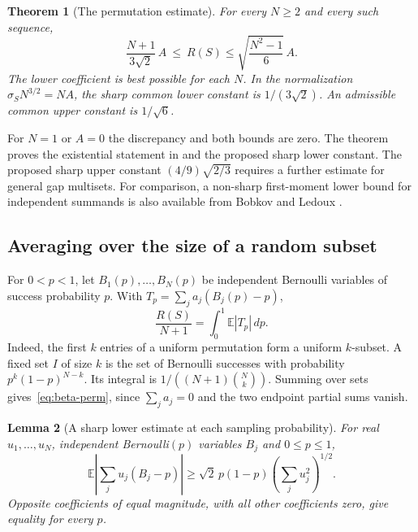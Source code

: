 \documentclass[11pt,a4paper]{article}
\newtheorem{theorem}{Theorem}[section]
\newtheorem{lemma}[theorem]{Lemma}
\begin{document}
\begin{theorem}[The permutation estimate]
\label{thm:fareyperm}
For every $N\ge 2$ and every such sequence,
\[
 \frac{N+1}{3\sqrt 2}\,A\ \le\ R(S) \le\sqrt{\frac{N^2-1}{6}}\,A.
\]
The lower coefficient is best possible for each $N$. In the
normalization $\sigma_S N^{3/2}=NA$, the sharp common lower constant
is $1/(3\sqrt2)$. An admissible common upper constant is $1/\sqrt 6$.
\end{theorem}

\noindent
For $N=1$ or $A=0$ the discrepancy and both bounds are zero.
The theorem proves the existential statement in \cite[Conjecture~1]{tg}
and the proposed sharp lower constant. The proposed sharp upper constant
$(4/9)\sqrt{2/3}$ requires a further estimate for general gap multisets.
For comparison, a non-sharp first-moment lower bound for independent
summands is also available from Bobkov and Ledoux \cite[Lemma 3.4]{bl}.

\subsection{Averaging over the size of a random subset}
For $0<p<1$, let $B_1(p),\ldots,B_N(p)$ be independent Bernoulli
variables of success probability $p$. With $T_p=\sum_j a_j(B_j(p)-p)$,
\begin{equation}
 \frac{R(S)}{N+1}=\int_0^1\mathbb E|T_p|\,dp .
 \label{eq:beta-perm}
\end{equation}
Indeed, the first $k$ entries of a uniform permutation form a uniform
$k$-subset. A fixed set $I$ of size $k$ is the set of Bernoulli
successes with probability $p^k(1-p)^{N-k}$. Its integral is
$1/((N+1)\binom Nk)$. Summing over sets gives~\eqref{eq:beta-perm},
since $\sum_j a_j=0$ and the two endpoint partial sums vanish.

\begin{lemma}[A sharp lower estimate at each sampling probability]
\label{lem:bias-bern}
For real $u_1,\ldots,u_N$, independent Bernoulli$(p)$ variables $B_j$
and $0\le p\le1$,
\[
 \mathbb E\left|\sum_j u_j(B_j-p)\right|
 \ge \sqrt2\,p(1-p)\left(\sum_j u_j^2\right)^{1/2}.
\]
Opposite coefficients of equal magnitude, with all other coefficients
zero, give equality for every $p$.
\end{lemma}
\end{document}
